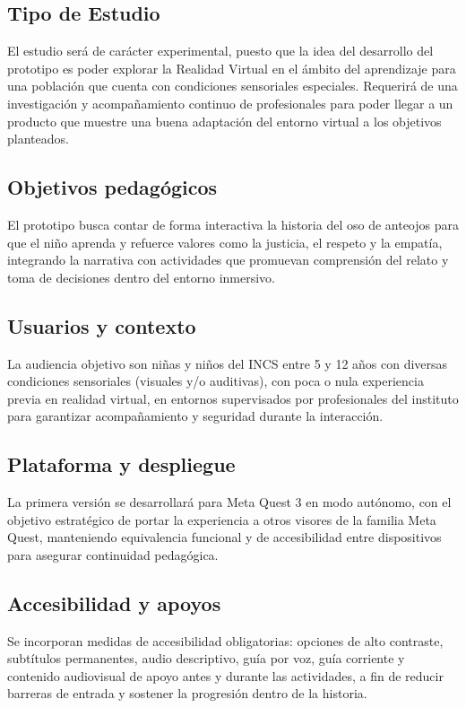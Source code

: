 \subsection{Tipo de Estudio}

El estudio será de carácter experimental, puesto que la idea del desarrollo del prototipo es poder explorar la 
Realidad Virtual en el ámbito del aprendizaje para una población que cuenta con condiciones sensoriales especiales. 
Requerirá de una investigación y acompañamiento continuo de profesionales para poder llegar a un producto que muestre 
una buena adaptación del entorno virtual a los objetivos planteados.


\subsection{Objetivos pedagógicos}
El prototipo busca contar de forma interactiva la historia del oso de anteojos para que el niño aprenda
 y refuerce valores como la justicia, el respeto y la empatía, integrando la narrativa con actividades
  que promuevan comprensión del relato y toma de decisiones dentro del entorno inmersivo. %


\subsection{Usuarios y contexto}
La audiencia objetivo son niñas y niños del INCS entre 5 y 12 años con diversas condiciones sensoriales
 (visuales y/o auditivas), con poca o nula experiencia previa en realidad virtual, en entornos supervisados
  por profesionales del instituto para garantizar acompañamiento y seguridad durante la interacción. %

\subsection{Plataforma y despliegue}
La primera versión se desarrollará para Meta Quest 3 en modo autónomo, con el objetivo estratégico de portar
 la experiencia a otros visores de la familia Meta Quest, manteniendo equivalencia funcional y de 
 accesibilidad entre dispositivos para asegurar continuidad pedagógica.

\subsection{Accesibilidad y apoyos}
Se incorporan medidas de accesibilidad obligatorias: opciones de alto contraste, subtítulos permanentes, 
audio descriptivo, guía por voz, guía corriente y contenido audiovisual de apoyo antes y durante las 
actividades, a fin de reducir barreras de entrada y sostener la progresión dentro de la historia. %

